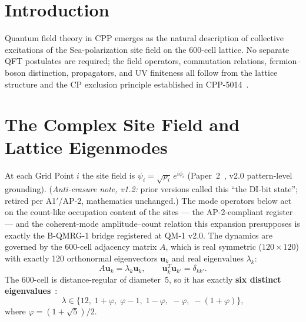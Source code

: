 \documentclass[11pt,letterpaper]{article}
\begin{document}
\bigskip
\raggedright
\tableofcontents
\newpage

\section{Introduction}

Quantum field theory in CPP emerges as the natural description of
collective excitations of the Sea-polarization site field on the
600-cell lattice.  No separate QFT postulates are required; the field operators,
commutation relations, fermion--boson distinction, propagators, and
UV finiteness all follow from the lattice structure and the CP exclusion
principle established in CPP-5014~\cite{cpp5014}.

\section{The Complex Site Field and Lattice Eigenmodes}

At each Grid Point $i$ the site field is $\psi_i =
\sqrt{\rho_i}\,e^{i\phi_i}$ (Paper~2~\cite{cpp2040a}, v2.0
pattern-level grounding).  (\emph{Anti-erasure note, v1.2:} prior
versions called this ``the DI-bit state''; retired per A1$'$/AP-2,
mathematics unchanged.)  The mode operators below act on the
count-like occupation content of the sites --- the AP-2-compliant
register --- and the coherent-mode amplitude--count relation this
expansion presupposes is exactly the B-QMRG-1 bridge registered at
QM-1 v2.0.  The dynamics
are governed by the 600-cell adjacency matrix $A$, which is real
symmetric ($120\times120$) with exactly 120 orthonormal eigenvectors
$\mathbf{u}_k$ and real eigenvalues $\lambda_k$:
\begin{equation}
A\mathbf{u}_k = \lambda_k\mathbf{u}_k, \qquad
\mathbf{u}_k^T\mathbf{u}_{k'} = \delta_{kk'}.
\label{eq:eigenmodes}
\end{equation}
The 600-cell is distance-regular of diameter~5, so it has exactly
\textbf{six distinct eigenvalues}~\cite{brouwer1989}:
\begin{equation}
\lambda \in \{12,\;1+\varphi,\;\varphi-1,\;1-\varphi,\;-\varphi,\;
-(1+\varphi)\},
\label{eq:eigenvalues}
\end{equation}
where $\varphi = (1+\sqrt5)/2$.
\end{document}
